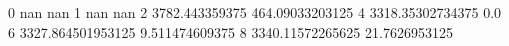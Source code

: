 0 nan nan
1 nan nan
2 3782.443359375 464.09033203125
4 3318.35302734375 0.0
6 3327.864501953125 9.511474609375
8 3340.11572265625 21.7626953125
